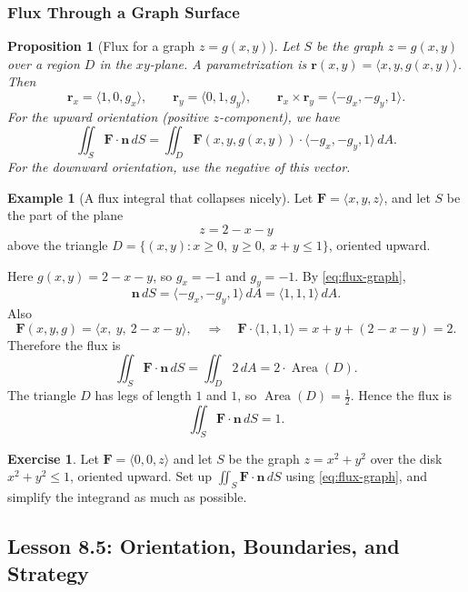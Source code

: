 \documentclass[12pt]{article}
\numberwithin{equation}{section}
\newcommand{\vect}[1]{\boldsymbol{#1}}   %
\theoremstyle{plain}
\newtheorem{proposition}[theorem]{Proposition}
\theoremstyle{definition}
\newtheorem{example}[theorem]{Example}
\newtheorem{exercise}[theorem]{Exercise}
\theoremstyle{remark}
\begin{document}
\subsubsection{Flux Through a Graph Surface}

\begin{proposition}[Flux for a graph $z=g(x,y)$]\label{prop:flux-graph}
Let $S$ be the graph $z=g(x,y)$ over a region $D$ in the $xy$-plane.
A parametrization is $\vect r(x,y)=\langle x,y,g(x,y)\rangle$.
Then
\[
\vect r_x=\langle 1,0,g_x\rangle,\qquad \vect r_y=\langle 0,1,g_y\rangle,
\qquad
\vect r_x\times\vect r_y=\langle -g_x,-g_y,1\rangle.
\]
For the \emph{upward} orientation (positive $z$-component), we have
\begin{equation}\label{eq:flux-graph}
\iint_S \vect F\cdot \vect n\,dS
=
\iint_D \vect F(x,y,g(x,y))\cdot \langle -g_x,-g_y,1\rangle\,dA.
\end{equation}
For the \emph{downward} orientation, use the negative of this vector.
\end{proposition}

\begin{example}[A flux integral that collapses nicely]\label{ex:flux-plane}
Let $\vect F=\langle x,y,z\rangle$, and let $S$ be the part of the plane
\[
z=2-x-y
\]
above the triangle $D=\{(x,y): x\ge 0,\ y\ge 0,\ x+y\le 1\}$, oriented upward.

Here $g(x,y)=2-x-y$, so $g_x=-1$ and $g_y=-1$. By \cref{eq:flux-graph},
\[
\vect n\,dS=\langle -g_x,-g_y,1\rangle\,dA=\langle 1,1,1\rangle\,dA.
\]
Also
\[
\vect F(x,y,g)=\langle x,\ y,\ 2-x-y\rangle,
\quad\Rightarrow\quad
\vect F\cdot \langle 1,1,1\rangle = x+y+(2-x-y)=2.
\]
Therefore the flux is
\[
\iint_S \vect F\cdot \vect n\,dS
=
\iint_D 2\,dA
=2\cdot \operatorname{Area}(D).
\]
The triangle $D$ has legs of length $1$ and $1$, so $\operatorname{Area}(D)=\frac12$. Hence the flux is
\[
\iint_S \vect F\cdot \vect n\,dS = 1.
\]
\end{example}

\begin{exercise}
Let $\vect F=\langle 0,0,z\rangle$ and let $S$ be the graph $z=x^2+y^2$ over the disk $x^2+y^2\le 1$, oriented upward.
Set up $\iint_S \vect F\cdot \vect n\,dS$ using \cref{eq:flux-graph}, and simplify the integrand as much as possible.
\end{exercise}

\subsection{Lesson 8.5: Orientation, Boundaries, and Strategy}
\end{document}
